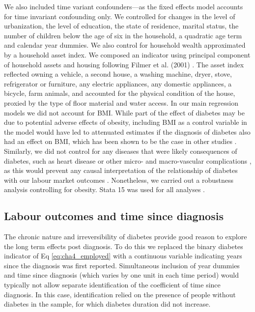 \documentclass[12pt,english]{article}
\begin{document}
We also included time variant confounders---as the fixed effects model accounts for time invariant confounding only. We controlled for changes in the level of urbanization, the level of education, the state of residence, marital status, the number of children below the age of six in the household, a quadratic age term and calendar year dummies.  We also control for household wealth approximated by a household asset index. We composed an indicator using principal component of household assets and housing following Filmer et al. (2001) \parencite{Filmer2001}. The asset index reflected owning a vehicle, a second house, a washing machine, dryer, stove, refrigerator or furniture, any electric appliances, any domestic appliances, a bicycle, farm animals, and accounted for the physical condition of the house, proxied by the type of floor material and water access. In our main regression models we did not account for \ac{BMI}. While part of the effect of diabetes may be due to potential adverse effects of obesity, including \ac{BMI} as a control variable in the model would have led to attenuated estimates if the diagnosis of diabetes also had an effect on \ac{BMI}, which has been shown to be the case in other studies \parencite{Slade2012,DeFineOlivarius2015,Seuring2018}. Similarly, we did not control for any diseases that were likely consequences of diabetes, such as heart disease or other micro- and macro-vascular complications \parencite{WorldHealthOrganization2016}, as this would prevent any causal interpretation of the relationship of diabetes with our labour market outcomes \parencite{Angrist2009a}. Nonetheless, we carried out a robustness analysis controlling for obesity. Stata 15 was used for all analyses \parencite{StataCorp2017}.


\subsection{Labour outcomes and time since diagnosis}

The chronic nature and irreversibility of diabetes provide good reason to explore the long term effects post diagnosis.  To do this we replaced the binary diabetes indicator of Eq \ref{eq:cha4_employed} with a continuous variable indicating years since the diagnosis was first reported. Simultaneous inclusion of year dummies and time since diagnosis (which varies by one unit in each time period) would typically not allow separate identification of the coefficient of time since diagnosis. In this case, identification relied on the presence of people without diabetes in the sample, for which diabetes duration did not increase.
\end{document}
